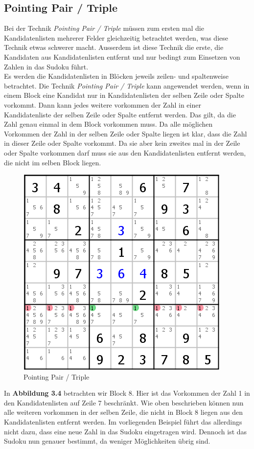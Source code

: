 \newpage
\subsection{Pointing Pair / Triple}
Bei der Technik \textit{Pointing Pair / Triple} müssen zum ersten mal die Kandidatenlisten mehrerer Felder gleichzeitig betrachtet werden, was diese Technik etwas schwerer macht. Ausserdem ist diese Technik die erste, die Kandidaten aus Kandidatenlisten entfernt und nur bedingt zum Einsetzen von Zahlen in das Sudoku führt.\\
Es werden die Kandidatenlisten in Blöcken jeweils zeilen- und spaltenweise betrachtet. Die Technik \textit{Pointing Pair / Triple}
kann angewendet werden, wenn in einem Block eine Kandidat nur in Kandidatenlisten der selben Zeile oder Spalte vorkommt. Dann kann jedes weitere vorkommen der Zahl in einer Kandidatenliste der selben Zeile oder Spalte entfernt werden. Das gilt, da die Zahl genau einmal in dem Block vorkommen muss. Da alle möglichen Vorkommen der Zahl in der selben Zeile oder Spalte liegen ist klar, dass die Zahl in dieser Zeile oder Spalte vorkommt. Da sie aber kein zweites mal in der Zeile oder Spalte vorkommen darf muss sie aus den Kandidatenlisten entfernt werden, die nicht im selben Block liegen.

\begin{figure}[h]
\begin{center}
\includegraphics{./img/pointing_pair_triple.png}
\caption{Pointing Pair / Triple}
\end{center}
\end{figure}

In \textbf{Abbildung 3.4} betrachten wir Block 8. Hier ist das Vorkommen der Zahl 1 in den Kandidatenlisten auf Zeile 7 beschränkt. Wie oben beschrieben können nun alle weiteren vorkommen in der selben Zeile, die nicht in Block 8 liegen aus den Kandidatenlisten entfernt werden. Im vorliegenden Beispiel führt das allerdings nicht dazu, dass eine neue Zahl in das Sudoku eingetragen wird. Dennoch ist das Sudoku nun genauer bestimmt, da weniger Möglichkeiten übrig sind.